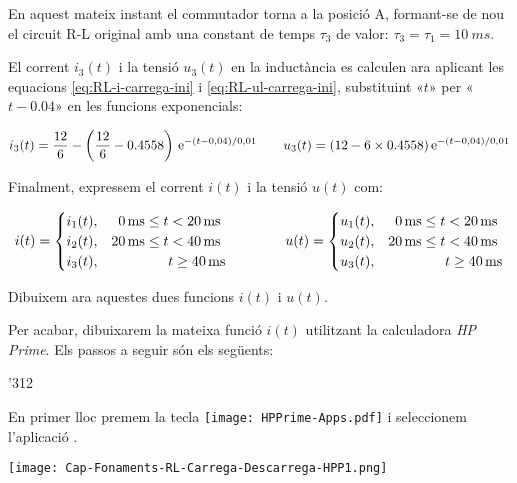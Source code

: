\begin{exemple}
    En aquest mateix instant  el commutador torna a la posició A, formant-se de nou el circuit R-L original amb una constant de temps $\tau_3$ de valor: $\tau_3 = \tau_1 = \SI{10}{ms}$.

    El corrent $i_3(t)$ i la tensió $u_3(t)$ en la inductància es calculen ara aplicant les equacions \eqref{eq:RL-i-carrega-ini} i \eqref{eq:RL-ul-carrega-ini}, substituint «$t$» per «$t-\num{0,04}$» en les funcions exponencials:

    \[
        i_3(t) = \frac{12}{6} - \left(\frac{12}{6}-\num{0,4558}\right) \,\mathrm{e}^{-(t-0,04)/0,01} \qquad
        u_3(t) = (12-6\times\num{0,4558}) \,\mathrm{e}^{-(t-0,04)/0,01}
    \]

    Finalment,  expressem el corrent $i(t)$  i la tensió $u(t)$ com:

    \[
        i(t) =
        \begin{cases}
            i_1(t), &  \phantom{0}\SI{0}{ms} \leq t < \SI{20}{ms} \\
            i_2(t), &  \SI{20}{ms} \leq t < \SI{40}{ms} \\
            i_3(t), &  \hspace{1.43cm}t \geq \SI{40}{ms}
        \end{cases}
        \qquad\qquad
        u(t) =
        \begin{cases}
            u_1(t), &  \phantom{0}\SI{0}{ms} \leq t < \SI{20}{ms} \\
            u_2(t), &  \SI{20}{ms} \leq t < \SI{40}{ms} \\
            u_3(t), &  \hspace{1.43cm}t \geq \SI{40}{ms}
        \end{cases}
    \]

    Dibuixem ara aquestes dues funcions  $i(t)$ i $u(t)$.

    \begin{center}
      
    \end{center}

    Per acabar, dibuixarem la mateixa funció $i(t)$ utilitzant la calculadora \emph{HP Prime}.
     Els passos a seguir són els següents:
    \begin{dingautolist}{'312}
        \item En primer lloc premem la tecla \texttt{[image: HPPrime-Apps.pdf]} i seleccionem l'aplicació .

             \texttt{[image: Cap-Fonaments-RL-Carrega-Descarrega-HPP1.png]}


\end{dingautolist}
\end{exemple}
